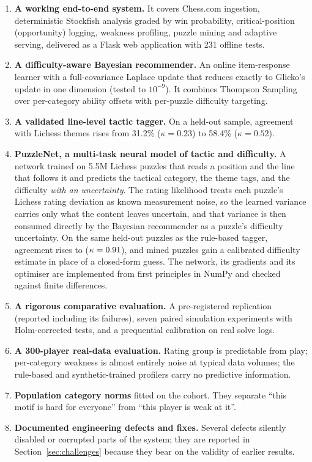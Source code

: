 \begin{enumerate}
  \item \textbf{A working end-to-end system.} It covers Chess.com ingestion, deterministic Stockfish
        analysis graded by win probability, critical-position (opportunity) logging, weakness
        profiling, puzzle mining and adaptive serving, delivered as a Flask web application with 231
        offline tests.
  \item \textbf{A difficulty-aware Bayesian recommender.} An online item-response learner with a
        full-covariance Laplace update that reduces exactly to Glicko's update in one dimension
        (tested to $10^{-9}$). It combines Thompson Sampling over per-category ability offsets with
        per-puzzle difficulty targeting.
  \item \textbf{A validated line-level tactic tagger.} On a held-out sample, agreement with Lichess
        themes rises from 31.2\% ($\kappa=0.23$) to 58.4\% ($\kappa=0.52$).
  \item \textbf{PuzzleNet, a multi-task neural model of tactic and difficulty.} A network trained on
        5.5M Lichess puzzles that reads a position and the line that follows it and predicts the
        tactical category, the theme tags, and the difficulty \emph{with an uncertainty}. The rating
        likelihood treats each puzzle's Lichess rating deviation as known measurement noise, so the
        learned variance carries only what the content leaves uncertain, and that variance is then
        consumed directly by the Bayesian recommender as a puzzle's difficulty uncertainty. On the same
        held-out puzzles as the rule-based tagger, agreement rises to \AGREENN{} ($\kappa=0.91{}$), and
        mined puzzles gain a calibrated difficulty estimate in place of a closed-form guess. The network,
        its gradients and its optimiser are implemented from first principles in NumPy and checked
        against finite differences.
  \item \textbf{A rigorous comparative evaluation.} A pre-registered replication (reported
        including its failures), seven paired simulation experiments with Holm-corrected tests, and a
        prequential calibration on real solve logs.
  \item \textbf{A 300-player real-data evaluation.} Rating group is predictable from play; per-category
        weakness is almost entirely noise at typical data volumes; the rule-based and
        synthetic-trained profilers carry no predictive information.
  \item \textbf{Population category norms} fitted on the cohort. They separate ``this motif is hard for
        everyone'' from ``this player is weak at it''.
  \item \textbf{Documented engineering defects and fixes.} Several defects silently disabled or
        corrupted parts of the system; they are reported in Section~\ref{sec:challenges} because they
        bear on the validity of earlier results.
\end{enumerate}


